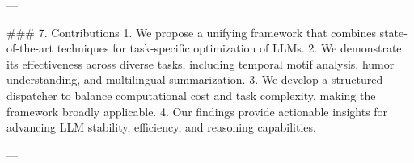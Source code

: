 ---

### 7. Contributions  
1. We propose a unifying framework that combines state-of-the-art techniques for task-specific optimization of LLMs.  
2. We demonstrate its effectiveness across diverse tasks, including temporal motif analysis, humor understanding, and multilingual summarization.  
3. We develop a structured dispatcher to balance computational cost and task complexity, making the framework broadly applicable.  
4. Our findings provide actionable insights for advancing LLM stability, efficiency, and reasoning capabilities.  

---

